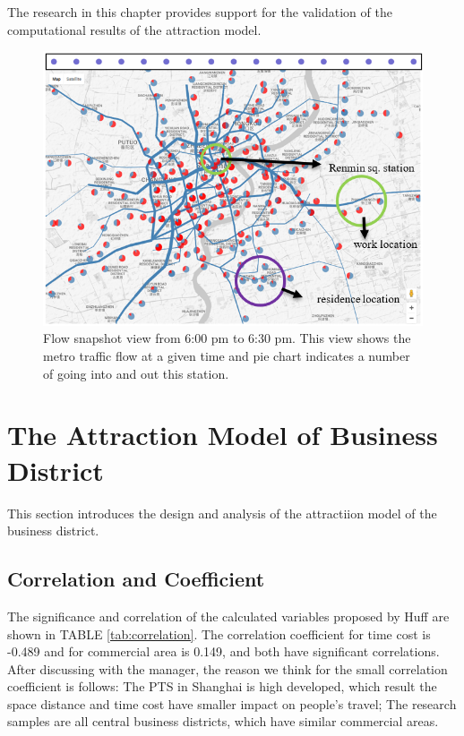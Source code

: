 \documentclass[journal]{IEEEtran}
\begin{document}
The research in this chapter provides support for the validation of the computational results of the attraction model.

\begin{figure}[tb]
\centering
\includegraphics[width=1\columnwidth]{figure5.png}
\caption{Flow snapshot view from 6:00 pm to 6:30 pm. This view shows the metro traffic flow at a given time and pie chart indicates a number of going into and out this station.}
\label{fig:Flow-view}
\end{figure}










\section{The Attraction Model of Business District}

This section introduces the design and analysis of the attractiion model of the business district.

\subsection{Correlation and Coefficient}

The significance and correlation of the calculated variables proposed by Huff are shown in TABLE \ref{tab:correlation}. The correlation coefficient for time cost is -0.489 and for commercial area is 0.149, and both have significant correlations. After discussing with the manager, the reason we think for the small correlation coefficient is follows: The PTS in Shanghai is high developed, which result the space distance and time cost have smaller impact on people's travel; The research samples are all central business districts, which have similar commercial areas.
\end{document}
